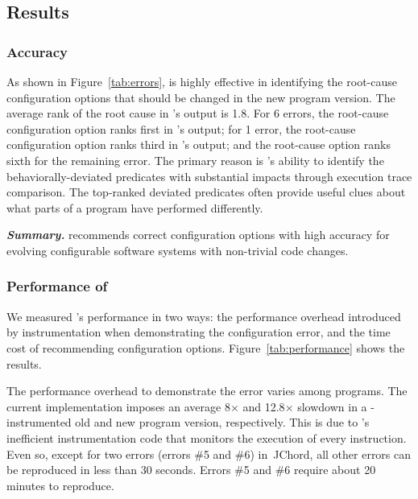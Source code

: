 \subsection{Results}

\subsubsection{Accuracy}
\label{sec:accuracy}

As shown in Figure~\ref{tab:errors}, \ourtool is highly effective
in identifying the root-cause configuration options that should
be changed in the new program version. The average rank of
the root cause in \ourtool's output is 1.8. For 6 errors, the
root-cause configuration option ranks first in \ourtool's output;
for 1 error, the root-cause configuration option ranks third
in \ourtool's output; and the root-cause option ranks sixth
for the remaining error. The primary reason is \ourtool's
ability to identify the behaviorally-deviated predicates with
substantial impacts through execution trace comparison.
The top-ranked deviated predicates often provide
useful clues about what parts of a program have performed
differently.




\vspace{1mm}

\noindent \textbf{\textit{Summary.}} \ourtool
recommends correct configuration options with
high accuracy for evolving configurable software systems
with non-trivial code changes.

\subsubsection{Performance of \ourtool}
\label{sec:timecost}

We measured \ourtool's performance in two ways:
the performance overhead introduced by instrumentation
when demonstrating the configuration error,
and the time cost of recommending configuration options.
Figure~\ref{tab:performance} shows the results.

The performance overhead to demonstrate the error
varies among programs. The current implementation
imposes an average 8$\times$ and 12.8$\times$ slowdown in a
\ourtool-instrumented old and new program version, respectively.
This is due to \ourtool's inefficient instrumentation code that
monitors the execution of every instruction.
Even so, except for two errors (errors \#5 and \#6) in\
JChord,  all other errors can
be reproduced in less than 30 seconds. Errors \#5 and \#6
require about 20 minutes to reproduce.

